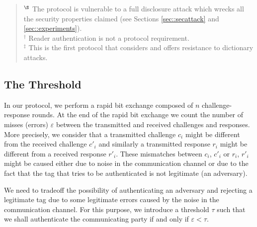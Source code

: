 \documentclass{article}
\newcommand \thr {\tau}
\newcommand \err {\varepsilon}
\begin{document}
\begin{table*}
\begin{scriptsize}
\begin{quote}
    $^\S$  The protocol is vulnerable to a full disclosure attack which wrecks all the security properties claimed (see Sections \ref{sec::secattack} and \ref{sec::experiments}). \\
    $^\dag$ Reader authentication is not a protocol requirement.   \\
    $^\ddag$ This is the first protocol that considers and offers resistance to dictionary attacks.
\end{quote}

\end{scriptsize}
\end{table*}


\subsection{The Threshold}
In our protocol, we perform a rapid bit exchange composed of $n$
challenge-response rounds.  At the end of the rapid bit exchange we
count the number of misses (errors) $\err$ between the transmitted and
received challenges and responses.  More precisely, we consider that a
transmitted challenge $c_{i}$ might be different from the received
challenge $c'_{i}$ and similarly a transmitted response $r_{i}$ might
be different from a received response $r'_{i}$. These mismatches
between $c_{i}$, $c'_{i}$ or $r_{i}$, $r'_{i}$ might be caused either
due to noise in the communication channel or due to the fact that the
tag that tries to be authenticated is not legitimate (an
adversary).

We need to tradeoff the possibility of authenticating an adversary and
rejecting a legitimate tag due to some legitimate errors caused by the
noise in the communication channel.
For this purpose, we introduce a threshold $\thr$ such that we shall
authenticate the communicating party if and only if $\err < \thr$.
\end{document}
